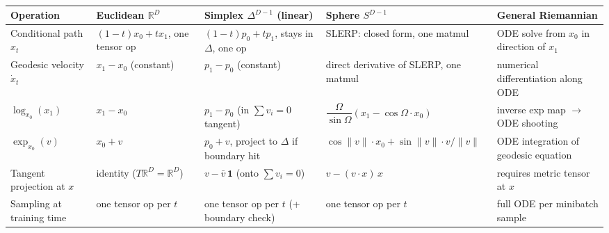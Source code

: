 \begin{table}[t]
\centering
\caption{}
\label{tab:geometry_fm_costs}
\renewcommand{\arraystretch}{1.25}
\setlength{\tabcolsep}{4pt}
\begin{tabular}{@{}p{2.7cm} p{3.2cm} p{3.6cm} p{4.0cm} p{3.5cm}@{}}
\toprule
Operation & Euclidean $\mathbb{R}^D$ & Simplex $\Delta^{D-1}$ (linear) & Sphere $S^{D-1}$ & General Riemannian \\
\midrule
Conditional path $x_t$ &
$(1{-}t)x_0 + t x_1$, one tensor op &
$(1{-}t)p_0 + t p_1$, stays in $\Delta$, one op &
SLERP: closed form, one matmul &
ODE solve from $x_0$ in direction of $x_1$ \\
\midrule
Geodesic velocity $\dot x_t$ &
$x_1 - x_0$ (constant) &
$p_1 - p_0$ (constant) &
direct derivative of SLERP, one matmul &
numerical differentiation along ODE \\
\midrule
$\log_{x_0}(x_1)$ &
$x_1 - x_0$ &
$p_1 - p_0$ (in $\sum v_i{=}0$ tangent) &
$\dfrac{\Omega}{\sin\Omega}(x_1 - \cos\Omega \cdot x_0)$ &
inverse exp map $\rightarrow$ ODE shooting \\
\midrule
$\exp_{x_0}(v)$ &
$x_0 + v$ &
$p_0 + v$, project to $\Delta$ if boundary hit &
$\cos\|v\|\cdot x_0 + \sin\|v\|\cdot v/\|v\|$ &
ODE integration of geodesic equation \\
\midrule
Tangent projection at $x$ &
identity ($T\mathbb{R}^D = \mathbb{R}^D$) &
$v - \bar v\,\mathbf{1}$ (onto $\sum v_i{=}0$) &
$v - (v\cdot x)\,x$ &
requires metric tensor at $x$ \\
\midrule
Sampling at training time &
one tensor op per $t$ &
one tensor op per $t$ (+ boundary check) &
one tensor op per $t$ &
full ODE per minibatch sample \\
\bottomrule
\end{tabular}
\end{table}